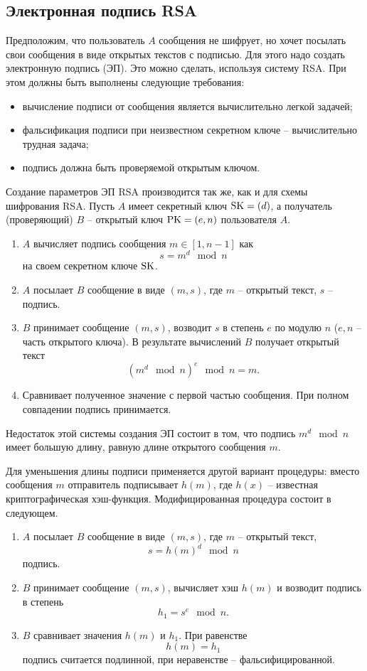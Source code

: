 \subsection[Электронная подпись]{Электронная подпись RSA}

Предположим, что пользователь $A$ сообщения не шифрует, но хочет посылать свои сообщения в виде открытых текстов с подписью. Для этого надо создать электронную подпись (ЭП). Это можно сделать, используя систему RSA. При этом должны быть выполнены следующие требования:
\begin{itemize}
    \item вычисление подписи от сообщения является вычислительно легкой задачей;
    \item фальсификация подписи при неизвестном секретном ключе -- вычислительно трудная задача;
    \item подпись должна быть проверяемой открытым ключом.
\end{itemize}

Создание параметров ЭП RSA производится так же, как и для схемы шифрования RSA. Пусть  $A$ имеет секретный ключ $\textrm{SK} = (d)$, а получатель (проверяющий) $B$ -- открытый ключ $\textrm{PK} = (e,n)$ пользователя $A$.

\begin{enumerate}
    \item $A$ вычисляет подпись сообщения $m \in [1,n-1]$ как
        \[ s = m^{d} \mod n \]
        на своем секретном ключе $\textrm{SK}$.
    \item $A$ посылает $B$ сообщение в виде $(m, s)$, где $m$ -- открытый текст, $s$ -- подпись.
    \item $B$ принимает сообщение $(m, s)$, возводит $s$ в степень $e$ по модулю $n$ ($e, n$ -- часть открытого ключа). В результате вычислений $B$ получает открытый текст
        \[ \left( m^{d} \mod n \right)^{e} \mod n = m. \]
    \item Сравнивает полученное значение с первой частью сообщения. При полном совпадении подпись принимается.
\end{enumerate}
Недостаток этой системы создания ЭП состоит в том, что подпись $m^{d} \mod n$ имеет большую длину, равную длине открытого сообщения $m$.

Для уменьшения длины подписи применяется другой вариант процедуры: вместо сообщения $m$ отправитель подписывает $h(m)$, где $h(x)$ -- известная криптографическая хэш-функция. Модифицированная процедура состоит в следующем.

\begin{enumerate}
    \item $A$ посылает $B$ сообщение в виде $(m, s)$, где $m$ -- открытый текст,
        \[ s = h(m)^d \mod n \]
        подпись.
    \item $B$ принимает сообщение $(m, s)$, вычисляет хэш $h(m)$ и возводит подпись в степень
        \[ h_1 = s^e \mod n. \]
    \item $B$ сравнивает значения $h(m)$ и $h_1$. При равенстве
        \[ h(m) = h_1 \]
        подпись считается подлинной, при неравенстве -- фальсифицированной.
\end{enumerate}


